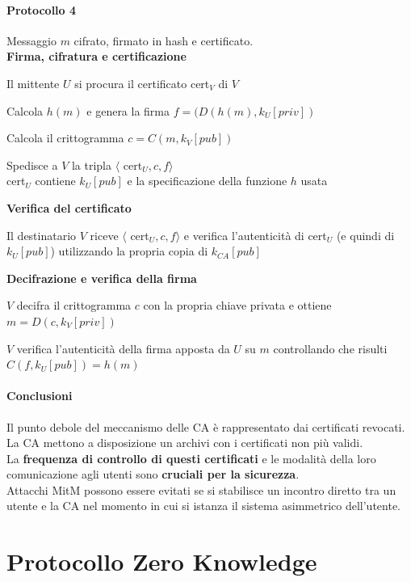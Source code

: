 \documentclass[10pt]{book}
\begin{document}
\paragraph{Protocollo 4} Messaggio $m$ cifrato, firmato in hash e certificato.\\
\textbf{Firma, cifratura e certificazione}
\begin{list}{}{}
	\item Il mittente $U$ si procura il certificato cert$_V$ di $V$
	\item Calcola $h(m)$ e genera la firma $f = (D(h(m), k_U[priv])$
	\item Calcola il crittogramma $c = C(m, k_V[pub])$
	\item Spedisce a $V$ la tripla $\langle$ cert$_U, c,f\rangle$\\
cert$_U$ contiene $k_U[pub]$ e la specificazione della funzione $h$ usata	
\end{list}
\textbf{Verifica del certificato}
\begin{list}{}{}
	\item Il destinatario $V$ riceve $\langle$ cert$_U, c,f\rangle$ e verifica l'autenticità di cert$_U$ (e quindi di $k_U[pub]$) utilizzando la propria copia di $k_{CA}[pub]$
\end{list}
\textbf{Decifrazione e verifica della firma}
\begin{list}{}{}
	\item $V$ decifra il crittogramma $c$ con la propria chiave privata e ottiene $m = D(c, k_V[priv])$
	\item $V$ verifica l'autenticità della firma apposta da $U$ su $m$ controllando che risulti $C(f,k_U[pub]) = h(m)$
\end{list}
\paragraph{Conclusioni} Il punto debole del meccanismo delle CA è rappresentato dai certificati revocati. La CA mettono a disposizione un archivi con i certificati non più validi.\\
La \textbf{frequenza di controllo di questi certificati} e le modalità della loro comunicazione agli utenti sono \textbf{cruciali per la sicurezza}.\\
Attacchi MitM possono essere evitati se si stabilisce un incontro diretto tra un utente e la CA nel momento in cui si istanza il sistema asimmetrico dell'utente.
\section{Protocollo Zero Knowledge}
\end{document}
